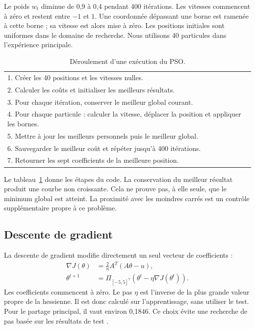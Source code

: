 \documentclass[conference,a4paper]{IEEEtran}
\begin{document}
Le poids $w_t$ diminue de 0,9 à 0,4 pendant 400 itérations. Les vitesses commencent à zéro et restent entre $-1$ et $1$. Une coordonnée dépassant une borne est ramenée à cette borne ; sa vitesse est alors mise à zéro. Les positions initiales sont uniformes dans le domaine de recherche. Nous utilisons 40 particules dans l'expérience principale.
\begin{table}[t]\centering\small
\caption{Déroulement d'une exécution du PSO.}\label{tab:pseudo}
\begin{tabular}{p{}}\toprule
1. Créer les 40 positions et les vitesses nulles.\\
2. Calculer les coûts et initialiser les meilleurs résultats.\\
3. Pour chaque itération, conserver le meilleur global courant.\\
4. Pour chaque particule : calculer la vitesse, déplacer la position et appliquer les bornes.\\
5. Mettre à jour les meilleurs personnels puis le meilleur global.\\
6. Sauvegarder le meilleur coût et répéter jusqu'à 400 itérations.\\
7. Retourner les sept coefficients de la meilleure position.\\\bottomrule
\end{tabular}
\end{table}
Le tableau~\ref{tab:pseudo} donne les étapes du code. La conservation du meilleur résultat produit une courbe non croissante. Cela ne prouve pas, à elle seule, que le minimum global est atteint. La proximité avec les moindres carrés est un contrôle supplémentaire propre à ce problème.

\subsection{Descente de gradient}
La descente de gradient modifie directement un seul vecteur de coefficients :
\begin{align}
\nabla J(\theta)&=\frac{2}{n}A^T(A\theta-u),\\
\theta^{t+1}&=\Pi_{[-5,5]^7}(\theta^t-\eta\nabla J(\theta^t)).
\end{align}
Les coefficients commencent à zéro. Le pas $\eta$ est l'inverse de la plus grande valeur propre de la hessienne. Il est donc calculé sur l'apprentissage, sans utiliser le test. Pour le partage principal, il vaut environ 0,1846. Ce choix évite une recherche de pas basée sur les résultats de test \cite{boyd}.
\end{document}
